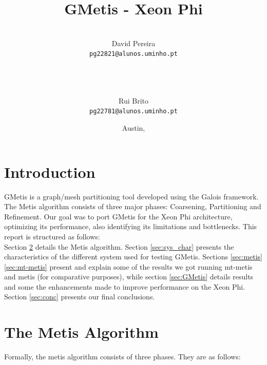 \documentclass[abstract=on,9pt,twocolumn]{scrartcl}
\title{GMetis - Xeon Phi}
\author{
    \\David Pereira\\
     	\texttt{\smaller pg22821@alunos.uminho.pt}
\\~\\~
\and\\Rui Brito\\
	\texttt{\smaller pg22781@alunos.uminho.pt}
}
\date{Austin, \docdate}
\begin{document}
\maketitle	



\begin{abstract}

\end{abstract}



\section{Introduction}
GMetis is a graph/mesh partitioning tool developed using the Galois framework. The Metis algorithm consists of three major phases: Coarsening, Partitioning and Refinement.
Our goal was to port GMetis for the Xeon Phi architecture, optimizing its performance, also identifying its limitations and bottlenecks.
This report is structured as follows:\\
Section \ref{sec:metis_alg} details the Metis algorithm. Section \ref{sec:sys_char} presents the characteristics of the different system used for testing GMetis. Sections \ref{sec:metis} \ref{sec:mt-metis} present and explain some of the results we got running mt-metis and metis (for comparative purposes), while section \ref{sec:GMetis} details results and some the enhancements made to improve performance on the Xeon Phi. Section \ref{sec:conc} presents our final conclusions.




\section{The Metis Algorithm}
\label{sec:metis_alg}

  Formally, the metis algorithm consists of three phases. They are as follows:
\end{document}

